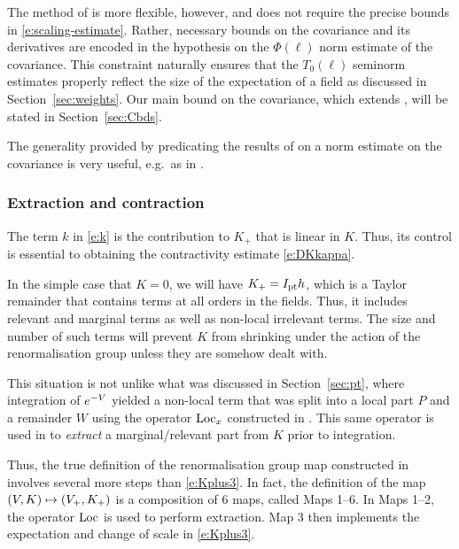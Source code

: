 The method of \cite{BS-rg-IE} is more flexible, however, and does not require
the precise bounds in \eqref{e:scaling-estimate}. Rather, necessary bounds on
the covariance and its derivatives are encoded in the hypothesis
\cite[\eqref{IE-e:CLbd}]{BS-rg-IE} on the $\Phi(\ell)$
norm estimate of the covariance. This constraint naturally ensures that the $T_0(\ell)$
seminorm estimates properly reflect the size of the expectation of a field as discussed
in Section~\ref{sec:weights}.
Our main bound on the covariance, which extends \cite[\eqref{IE-e:CLbd}]{BS-rg-IE},
will be stated in Section~\ref{sec:Cbds}.

\begin{rk}
The generality provided by predicating the results of \cite{BS-rg-IE} on a
norm estimate on the covariance is very useful, e.g.\ as in \cite{Slad17}.
\end{rk}

\subsubsection{Extraction and contraction}

The term $k$ in \eqref{e:k} is the contribution to $K_+$ that is linear in $K$. Thus, its
control is essential to obtaining the contractivity estimate \eqref{e:DKkappa}.

In the simple case that $K = 0$, we will have $K_+ = I_{\rm pt} h$, which is a Taylor
remainder that contains terms at all orders in the fields. Thus, it includes
relevant and marginal terms as well as non-local irrelevant terms.
The size and number of such terms will prevent $K$ from shrinking under the action
of the renormalisation group unless they are somehow dealt with.

This situation is not unlike what was discussed in Section~\ref{sec:pt}, where
integration of $e^{-V}$ yielded a non-local term that was split into a local
part $P$ and a remainder $W$ using the operator $\operatorname{Loc}_x$ constructed in
\cite{BBS-rg-pt}. This same operator is used in \cite{BS-rg-step} to \emph{extract}
a marginal/relevant part from $K$ prior to integration.

Thus, the true definition of the renormalisation group map constructed in
\cite{BS-rg-step} involves several more steps than \eqref{e:Kplus3}. In fact,
the definition of the map $(V, K) \mapsto (V_+, K_+)$ is a composition of
$6$ maps, called Maps 1--6. In Maps 1--2, the operator $\operatorname{Loc}$ is used to perform
extraction. Map 3 then implements the expectation and change of scale in
\eqref{e:Kplus3}.

